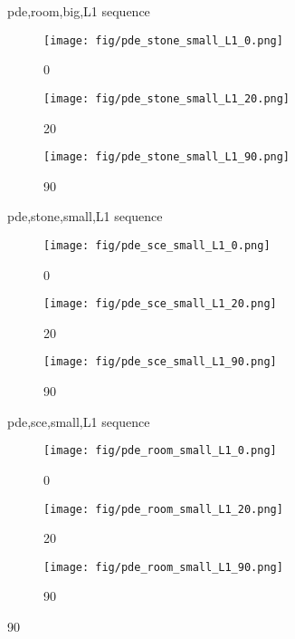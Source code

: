 \begin{figure}
  \caption{pde,room,big,L1 sequence}
  \label{fig:three_images}
\end{figure}\begin{figure} 
    \centering
    \begin{subfigure}[b]{0.3\textwidth}
    \texttt{[image: fig/pde\_stone\_small\_L1\_0.png]}
    \caption{0}
    \label{fig:image1}
  \end{subfigure}
  \hfill
  \begin{subfigure}[b]{0.3\textwidth}
    \texttt{[image: fig/pde\_stone\_small\_L1\_20.png]}
    \caption{20}
    \label{fig:image2}
  \end{subfigure}
  \hfill
  \begin{subfigure}[b]{0.3\textwidth}
    \texttt{[image: fig/pde\_stone\_small\_L1\_90.png]}
    \caption{90}
    \label{fig:image3}
  \end{subfigure}

  \caption{pde,stone,small,L1 sequence}
  \label{fig:three_images}
\end{figure}\begin{figure} 
    \centering
    \begin{subfigure}[b]{0.3\textwidth}
    \texttt{[image: fig/pde\_sce\_small\_L1\_0.png]}
    \caption{0}
    \label{fig:image1}
  \end{subfigure}
  \hfill
  \begin{subfigure}[b]{0.3\textwidth}
    \texttt{[image: fig/pde\_sce\_small\_L1\_20.png]}
    \caption{20}
    \label{fig:image2}
  \end{subfigure}
  \hfill
  \begin{subfigure}[b]{0.3\textwidth}
    \texttt{[image: fig/pde\_sce\_small\_L1\_90.png]}
    \caption{90}
    \label{fig:image3}
  \end{subfigure}

  \caption{pde,sce,small,L1 sequence}
  \label{fig:three_images}
\end{figure}\begin{figure} 
    \centering
    \begin{subfigure}[b]{0.3\textwidth}
    \texttt{[image: fig/pde\_room\_small\_L1\_0.png]}
    \caption{0}
    \label{fig:image1}
  \end{subfigure}
  \hfill
  \begin{subfigure}[b]{0.3\textwidth}
    \texttt{[image: fig/pde\_room\_small\_L1\_20.png]}
    \caption{20}
    \label{fig:image2}
  \end{subfigure}
  \hfill
  \begin{subfigure}[b]{0.3\textwidth}
    \texttt{[image: fig/pde\_room\_small\_L1\_90.png]}
    \caption{90}
    \label{fig:image3}
  \end{subfigure}


\end{figure}

